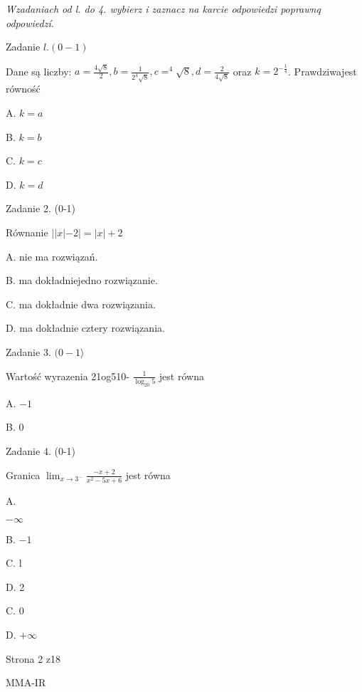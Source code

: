 \documentclass[a4paper,12pt]{article}
\begin{document}
{\it Wzadaniach od l. do 4. wybierz i zaznacz na karcie odpowiedzi poprawnq odpowiedzí}.

Zadanie $l. (0-1)$

Dane są liczby: $a=\displaystyle \frac{4\sqrt{8}}{2}, b=\displaystyle \frac{1}{2^{4}\sqrt{8}}, c=^{4}\sqrt{8}, d=\displaystyle \frac{2}{4\sqrt{8}}$ oraz $k=2^{-\frac{1}{4}}$. Prawdziwajest równość

A. $k=a$

B. $k=b$

C. $k=c$

D. $k=d$

Zadanie 2. (0-1)

Równanie $||x|-2|=|x|+2$

A. nie ma rozwiązań.

B. ma dokładniejedno rozwiązanie.

C. ma dokładnie dwa rozwiązania.

D. ma dokładnie cztery rozwiązania.

Zadanie 3. $(0-1\rangle$

Wartość wyrazenia 21og510- $\displaystyle \frac{1}{\log_{20}5}$ jest równa

A. $-1$

B. 0

Zadanie 4. (0-1)

Granica $\displaystyle \lim_{x\rightarrow 3^{-}}\frac{-x+2}{x^{2}-5x+6}$ jest równa

A.

$-\infty$

B. $-1$

C. l

D. 2

C. 0

D. $+\infty$

Strona 2 z18

MMA-IR
\end{document}
